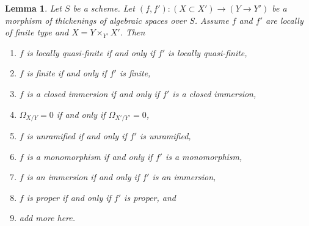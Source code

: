 \documentclass[10pt,a4paper]{amsart}
\theoremstyle{plain}
\newtheorem{lemma}[subsection]{Lemma}
\theoremstyle{definition}
\theoremstyle{remark}
\numberwithin{equation}{subsection}
\begin{document}
\begin{lemma}
\label{lemma-properties-that-extend-over-thickenings}
Let $S$ be a scheme. Let $(f, f') : (X \subset X') \to (Y \to Y')$ be a
morphism of thickenings of algebraic spaces over $S$. Assume $f$ and $f'$
are locally of finite type and $X = Y \times_{Y'} X'$. Then
\begin{enumerate}
\item $f$ is locally quasi-finite if and only if $f'$ is locally quasi-finite,
\item $f$ is finite if and only if $f'$ is finite,
\item $f$ is a closed immersion if and only if $f'$ is a closed immersion,
\item $\Omega_{X/Y} = 0$ if and only if $\Omega_{X'/Y'} = 0$,
\item $f$ is unramified if and only if $f'$ is unramified,
\item $f$ is a monomorphism if and only if $f'$ is a monomorphism,
\item $f$ is an immersion if and only if $f'$ is an immersion,
\item $f$ is proper if and only if $f'$ is proper, and
\item add more here.
\end{enumerate}
\end{lemma}
\end{document}
